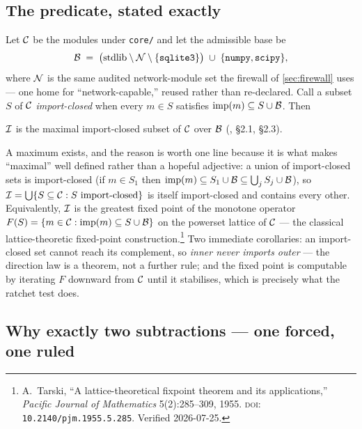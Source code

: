 \subsection*{The predicate, stated exactly}

Let $\mathcal{C}{}$ be the modules under \texttt{core/} and let the admissible base be
\[
  \mathcal{B}{} \;=\; \bigl(\text{stdlib} \setminus \mathcal{N}{} \setminus
  \{\texttt{sqlite3}\}\bigr) \;\cup\; \{\texttt{numpy}, \texttt{scipy}\},
\]
where $\mathcal{N}{}$ is the same audited network-module set the firewall of
\autoref{sec:firewall} uses --- one home for ``network-capable,'' reused rather
than re-declared. Call a subset $S$ of $\mathcal{C}{}$ \emph{import-closed} when
every $m \in S$ satisfies $\operatorname{imp}(m) \subseteq S \cup \mathcal{B}{}$. Then

\begin{invariant}
\label{inv:ring}
$\mathcal{I}{}$ is the maximal import-closed subset of $\mathcal{C}{}$ over
$\mathcal{B}{}$ (, \S 2.1, \S 2.3).
\end{invariant}

A maximum exists, and the reason is worth one line because it is what makes
``maximal'' well defined rather than a hopeful adjective: a union of import-closed
sets is import-closed (if $m \in S_1$ then $\operatorname{imp}(m) \subseteq S_1 \cup
\mathcal{B}{} \subseteq \bigcup_j S_j \cup \mathcal{B}{}$), so
$\mathcal{I}{} = \bigcup \{ S \subseteq \mathcal{C}{} : S \text{ import-closed}\}$ is
itself import-closed and contains every other. Equivalently, $\mathcal{I}{}$ is the
greatest fixed point of the monotone operator
$F(S) = \{ m \in \mathcal{C}{} : \operatorname{imp}(m) \subseteq S \cup \mathcal{B}{}\}$ on the
powerset lattice of $\mathcal{C}{}$ --- the classical lattice-theoretic
fixed-point construction.\footnote{A.~Tarski, ``A lattice-theoretical fixpoint
theorem and its applications,'' \emph{Pacific Journal of Mathematics} 5(2):285--309,
1955. \textsc{doi}:\,\texttt{10.2140/pjm.1955.5.285}. Verified 2026-07-25.} Two
immediate corollaries: an import-closed set cannot reach its complement, so
\emph{inner never imports outer} --- the direction law is a theorem, not a further
rule; and the fixed point is computable by iterating $F$ downward from
$\mathcal{C}{}$ until it stabilises, which is precisely what the ratchet test does.

\subsection*{Why exactly two subtractions --- one forced, one ruled}

